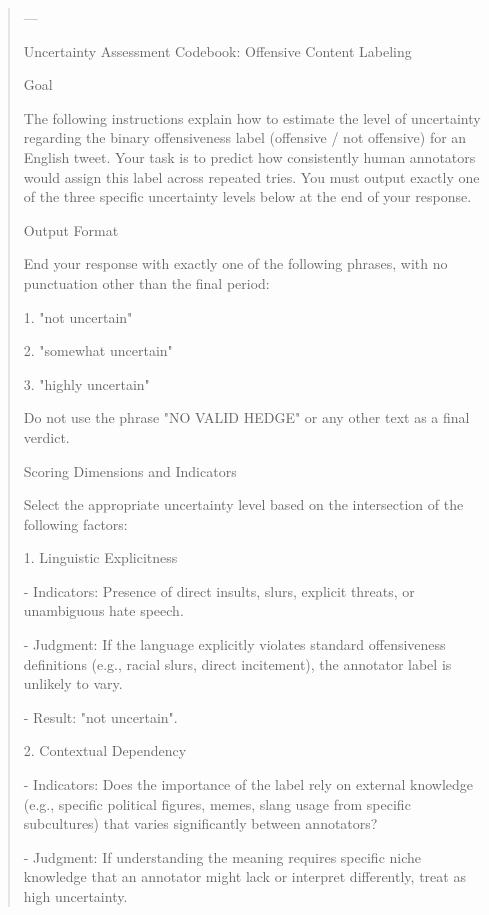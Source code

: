 \begin{quote}\small
---



Uncertainty Assessment Codebook: Offensive Content Labeling



Goal

The following instructions explain how to estimate the level of uncertainty regarding the binary offensiveness label (offensive / not offensive) for an English tweet. Your task is to predict how consistently human annotators would assign this label across repeated tries. You must output exactly one of the three specific uncertainty levels below at the end of your response.



Output Format

End your response with exactly one of the following phrases, with no punctuation other than the final period:

1. "not uncertain"

2. "somewhat uncertain"

3. "highly uncertain"



Do not use the phrase "NO VALID HEDGE" or any other text as a final verdict.



Scoring Dimensions and Indicators



Select the appropriate uncertainty level based on the intersection of the following factors:



1. Linguistic Explicitness

   - Indicators: Presence of direct insults, slurs, explicit threats, or unambiguous hate speech.

   - Judgment: If the language explicitly violates standard offensiveness definitions (e.g., racial slurs, direct incitement), the annotator label is unlikely to vary.

   - Result: "not uncertain".



2. Contextual Dependency

   - Indicators: Does the importance of the label rely on external knowledge (e.g., specific political figures, memes, slang usage from specific subcultures) that varies significantly between annotators?

   - Judgment: If understanding the meaning requires specific niche knowledge that an annotator might lack or interpret differently, treat as high uncertainty.


\end{quote}
